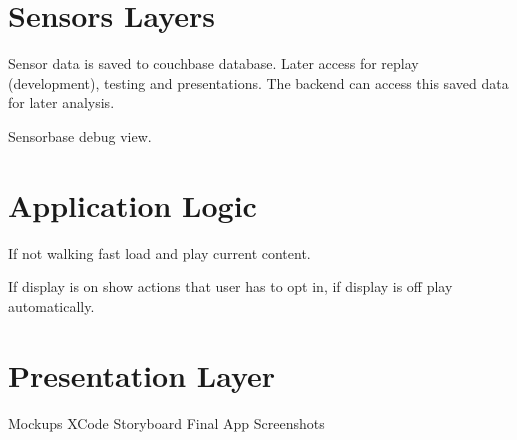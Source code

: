 \section{Sensors Layers}

Sensor data is saved to couchbase database.
Later access for replay (development), testing and presentations.
The backend can access this saved data for later analysis.

Sensorbase debug view.
\cite{GCD-Reference}

\section{Application Logic}

If not walking fast load and play current content.

If display is on show actions that user has to opt in, if display is off play automatically. 

\section{Presentation Layer}

Mockups
XCode Storyboard
Final App Screenshots